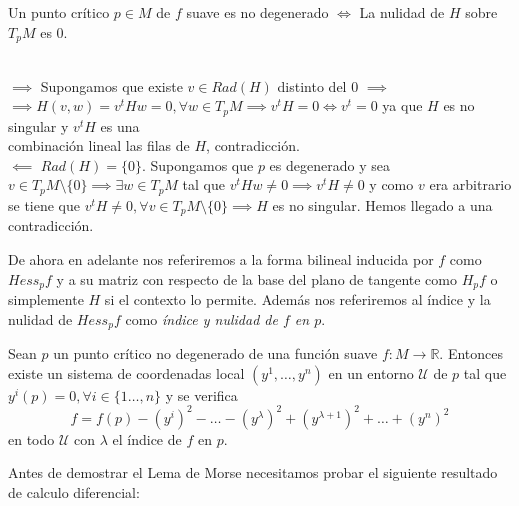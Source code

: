 \begin{remark}
    Un punto crítico $p\in M$ de $f$ suave es no degenerado $\iff$ La nulidad de $H$ sobre $T_pM$ es $0$. 
\end{remark}
    \mbox{}\\[0.5em]
    $\boxed{\implies}$ Supongamos que existe $v\in Rad(H)$ distinto del $0$ $\implies$ \\
    $\implies H(v,w)=v^tHw=0, \forall w\in T_pM \implies v^tH=0 \iff v^t = 0$  ya que $H$ es no singular y $v^tH$ es una \\
    combinación lineal las filas de $H$, contradicción.\\

    $\boxed{\impliedby}$ $Rad(H)=\{0\}$. Supongamos que $p$ es degenerado y sea $v\in T_pM\setminus\{0\} \implies \exists w\in T_pM$ tal que $v^tHw\neq 0 \implies v^tH\neq 0$ y como $v$ era arbitrario se tiene que $v^tH\neq 0,\forall v\in T_pM\setminus\{0\} \implies H$ es no singular. Hemos llegado a una contradicción.


\begin{nota}
    De ahora en adelante nos referiremos a la forma bilineal inducida por $f$ como $Hess_pf$ y a su matriz con respecto de la base del plano de tangente como $H_pf$ o simplemente $H$ si el contexto lo permite. Además nos referiremos al índice y la nulidad de $Hess_pf$ como \textit{índice y nulidad de $f$ en $p$}.
\end{nota}
\bigskip


\begin{lemma}
\label{lemamorse}
    Sean $p$ un punto crítico no degenerado de una función suave $f:M\to \mathbb{R}$. Entonces existe un sistema de coordenadas local $(y^1,\dots, y^n)$ en un entorno $\mathcal{U}$ de $p$ tal que $y^i(p)=0, \forall i\in \{1\dots,n\}$ y se verifica
    \begin{equation*}
        f=f(p)-(y^i)^2-\dots-(y^\lambda)^2 + (y^{\lambda +1})^2+\dots + (y^n)^2
    \end{equation*}
    en todo $\mathcal{U}$ con $\lambda$ el índice de $f$ en $p$.
\end{lemma}
\bigskip

Antes de demostrar el Lema de Morse necesitamos probar el siguiente resultado de calculo diferencial:

